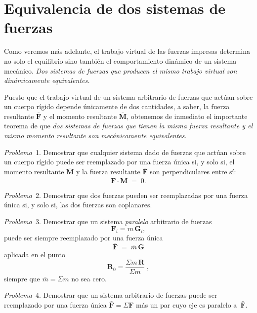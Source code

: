 \section{Equivalencia de dos sistemas de fuerzas}

Como veremos más adelante, el trabajo virtual de las fuerzas impresas determina no solo el equilibrio sino también el comportamiento dinámico de un sistema mecánico. \emph{Dos sistemas de fuerzas que producen el mismo trabajo virtual son dinámicamente equivalentes.}

Puesto que el trabajo virtual de un sistema arbitrario de fuerzas que actúan sobre un cuerpo rígido depende únicamente de dos cantidades, a saber, la fuerza resultante $\bar{\mathbf{F}}$ y el momento resultante $\bar{\mathbf{M}}$, obtenemos de inmediato el importante teorema de que \emph{dos sistemas de fuerzas que tienen la misma fuerza resultante y el mismo momento resultante son mecánicamente equivalentes}.

\medskip
\noindent\textit{Problema}~1. Demostrar que cualquier sistema dado de fuerzas que actúan sobre un cuerpo rígido puede ser reemplazado por una fuerza única si, y solo si, el momento resultante $\bar{\mathbf{M}}$ y la fuerza resultante $\bar{\mathbf{F}}$ son perpendiculares entre sí:
\begin{equation}
\bar{\mathbf{F}} \cdot \bar{\mathbf{M}} \;=\; 0. \tag{33.1}
\end{equation}

\noindent\textit{Problema}~2. Demostrar que dos fuerzas pueden ser reemplazadas por una fuerza única si, y solo si, las dos fuerzas son coplanares.

\medskip
\noindent\textit{Problema}~3. Demostrar que un sistema \emph{paralelo} arbitrario de fuerzas
\begin{equation}
\mathbf{F}_i = m\,\mathbf{G}_i, \tag{33.2}
\end{equation}
puede ser siempre reemplazado por una fuerza única
\begin{equation}
\bar{\mathbf{F}} \;=\; \bar{m}\,\mathbf{G} \tag{33.3}
\end{equation}
aplicada en el punto
\begin{equation}
\mathbf{R}_0 = \frac{\Sigma m\,\mathbf{R}}{\Sigma m}\;, \tag{33.4}
\end{equation}
siempre que $\bar{m} = \Sigma m$ no sea cero.

\medskip
\noindent\textit{Problema}~4. Demostrar que un sistema arbitrario de fuerzas puede ser reemplazado por una fuerza única $\bar{\mathbf{F}} = \Sigma\mathbf{F}$ más un par cuyo eje es paralelo a~$\bar{\mathbf{F}}$.

